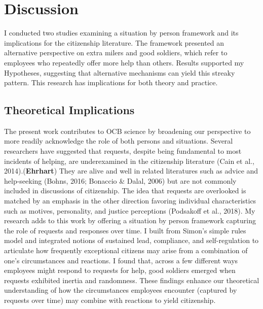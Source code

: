 \documentclass[english,,man]{apa6}
\begin{document}
\hypertarget{discussion}{%
\section{Discussion}\label{discussion}}

I conducted two studies examining a situation by person framework and its implications for the citizenship literature. The framework presented an alternative perspective on extra milers and good soldiers, which refer to employees who repeatedly offer more help than others. Results supported my Hypotheses, suggesting that alternative mechanisms can yield this streaky pattern. This research has implications for both theory and practice.

\hypertarget{theoretical-implications}{%
\subsection{Theoretical Implications}\label{theoretical-implications}}

The present work contributes to OCB science by broadening our perspective to more readily acknowledge the role of both persons and situations. Several researchers have suggested that requests, despite being fundamental to most incidents of helping, are underexamined in the citizenship literature (Cain et al., 2014).(\textbf{Ehrhart}) They are alive and well in related literatures such as advice and help-seeking (Bohns, 2016; Bonaccio \& Dalal, 2006) but are not commonly included in discussions of citizenship. The idea that requests are overlooked is matched by an emphasis in the other direction favoring individual characteristics such as motives, personality, and justice perceptions (Podsakoff et al., 2018). My research adds to this work by offering a situation by person framework capturing the role of requests and responses over time. I built from Simon's simple rules model and integrated notions of sustained lead, compliance, and self-regulation to articulate how frequently exceptional citizens may arise from a combination of one's circumstances and reactions. I found that, across a few different ways employees might respond to requests for help, good soldiers emerged when requests exhibited inertia and randomness. These findings enhance our theoretical understanding of how the circumstances employees encounter (captured by requests over time) may combine with reactions to yield citizenship.
\end{document}
